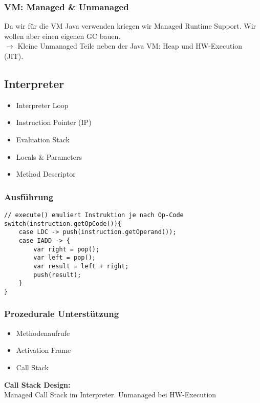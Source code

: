 \subsubsection{VM: Managed \& Unmanaged}
Da wir für die VM Java verwenden kriegen wir Managed Runtime Support. Wir wollen aber einen eigenen GC bauen.\\
$\rightarrow$ Kleine Unmanaged Teile neben der Java VM: Heap und HW-Execution (JIT).

\subsection{Interpreter}
\begin{itemize}[topsep=0pt]
    \itemsep -0.2em
    \item Interpreter Loop
    \item Instruction Pointer (IP)
    \item Evaluation Stack
    \item Locals \& Parameters
    \item Method Descriptor
\end{itemize}

\subsubsection{Ausführung}
\begin{lstlisting}
// execute() emuliert Instruktion je nach Op-Code
switch(instruction.getOpCode()){
    case LDC -> push(instruction.getOperand());
    case IADD -> {
        var right = pop();
        var left = pop();
        var result = left + right;
        push(result);
    }
}
\end{lstlisting}

\subsubsection{Prozedurale Unterstützung}
\begin{itemize}[topsep=0pt]
    \itemsep -0.2em
    \item Methodenaufrufe
    \item Activation Frame
    \item Call Stack
\end{itemize}
\textbf{Call Stack Design:}\\
Managed Call Stack im Interpreter. Unmanaged bei HW-Execution

